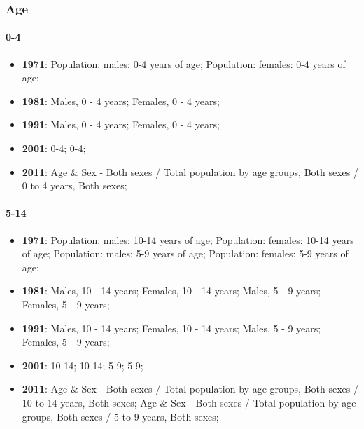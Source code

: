 \documentclass[a4paper]{article}
\begin{document}
\subsubsection{Age}
\paragraph{0-4}
\begin{itemize}
   \item{\textbf{1971}:  Population: males: 0-4 years of age; Population: females: 0-4 years of age;}
   \item{\textbf{1981}:  Males, 0 - 4 years; Females, 0 - 4 years;}
   \item{\textbf{1991}:  Males, 0 - 4 years; Females, 0 - 4 years;}
   \item{\textbf{2001}:  0-4; 0-4;}
   \item{\textbf{2011}:  Age \& Sex - Both sexes / Total population by age groups, Both sexes / 0 to 4 years, Both sexes;}
\end{itemize}

\paragraph{5-14}
\begin{itemize}
   \item{\textbf{1971}:  Population: males: 10-14 years of age; Population: females: 10-14 years of age; Population: males: 5-9 years of age; Population: females: 5-9 years of age;}
   \item{\textbf{1981}:  Males, 10 - 14 years; Females, 10 - 14 years; Males, 5 - 9 years; Females, 5 - 9 years;}
   \item{\textbf{1991}:  Males, 10 - 14 years; Females, 10 - 14 years; Males, 5 - 9 years; Females, 5 - 9 years;}
   \item{\textbf{2001}:  10-14; 10-14; 5-9; 5-9;}
   \item{\textbf{2011}:  Age \& Sex - Both sexes / Total population by age groups, Both sexes / 10 to 14 years, Both sexes; Age \& Sex - Both sexes / Total population by age groups, Both sexes / 5 to 9 years, Both sexes;}
\end{itemize}
\end{document}
